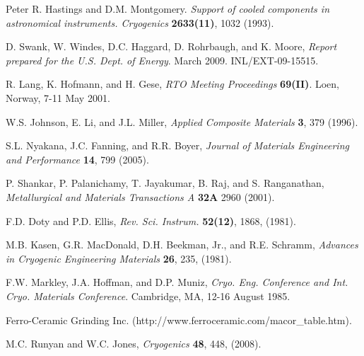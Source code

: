 \documentclass[final]{svjour2}
\begin{document}
\begin{thebibliography}{99}

Peter R. Hastings and D.M. Montgomery. {\it Support of cooled components in astronomical instruments. Cryogenics} \textbf{2633(11)}, 1032 (1993).


D. Swank, W. Windes, D.C. Haggard, D. Rohrbaugh, and K. Moore, {\it Report prepared for the U.S. Dept. of Energy}. March 2009. INL/EXT-09-15515.

R. Lang, K. Hofmann, and H. Gese, {\it RTO Meeting Proceedings} \textbf{69(II)}. Loen, Norway, 7-11 May 2001.

W.S. Johnson, E. Li, and J.L. Miller, {\it Applied Composite Materials} \textbf{3}, 379 (1996).

S.L. Nyakana, J.C. Fanning, and R.R. Boyer, {\it Journal of Materials Engineering and Performance} \textbf{14}, 799 (2005).

P. Shankar, P. Palanichamy, T. Jayakumar, B. Raj, and S. Ranganathan, {\it Metallurgical and Materials Transactions A} \textbf{32A} 2960 (2001).

F.D. Doty and P.D. Ellis, {\it Rev. Sci. Instrum.} \textbf{52(12)}, 1868, (1981).

M.B. Kasen, G.R. MacDonald, D.H. Beekman, Jr., and R.E. Schramm, {\it Advances in Cryogenic Engineering Materials} \textbf{26}, 235, (1981).

F.W. Markley, J.A. Hoffman, and D.P. Muniz, {\it Cryo. Eng. Conference and Int. Cryo. Materials Conference}. Cambridge, MA, 12-16 August 1985.

Ferro-Ceramic Grinding Inc. (http://www.ferroceramic.com/macor\_table.htm).


M.C. Runyan and W.C. Jones, {\it Cryogenics} \textbf{48}, 448, (2008).


\end{thebibliography}
\end{document}
